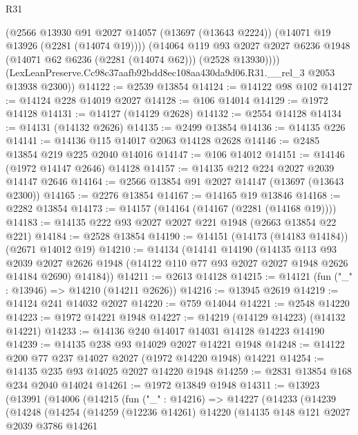 \begin{lexlean}{R31}
\begin{coremodule}
          (@2566
            @13930
            @91
            @2027
            @14057
            (@13697 (@13643 @2224))
            (@14071 @19 @13926 (@2281 (@14074 @19))))
          (@14064
            @119
            @93
            @2027
            @2027
            @6236
            @1948
            (@14071 @62 @6236 (@2281 (@14074 @62)))
            (@2528 @13930))))
      (LexLeanPreserve.Cc98c37aafb92bdd8ec108aa430da9d06.R31.__rel_3 @2053 @13938 @2300))
@14122 := @2539 @13854
@14124 := @14122 @98 @102
@14127 := @14124 @228 @14019 @2027
@14128 := @106 @14014
@14129 := @1972 @14128
@14131 := @14127 (@14129 @2628)
@14132 := @2554 @14128
@14134 := @14131 (@14132 @2626)
@14135 := @2499 @13854
@14136 := @14135 @226
@14141 := @14136 @115 @14017 @2063 @14128 @2628
@14146 := @2485 @13854 @219 @225 @2040 @14016
@14147 := @106 @14012
@14151 := @14146 (@1972 @14147 @2646) @14128
@14157 := @14135 @212 @224 @2027 @2039 @14147 @2646
@14164 := @2566 @13854 @91 @2027 @14147 (@13697 (@13643 @2300))
@14165 := @2276 @13854
@14167 := @14165 @19 @13846
@14168 := @2282 @13854
@14173 := @14157 (@14164 (@14167 (@2281 (@14168 @19))))
@14183 := @14135 @222 @93 @2027 @2027 @221 @1948 (@2663 @13854 @22 @221)
@14184 := @2528 @13854
@14190 := @14151 (@14173 (@14183 @14184)) (@2671 @14012 @19)
@14210 := @14134
    (@14141
      @14190
      (@14135
        @113
        @93
        @2039
        @2027
        @2626
        @1948
        (@14122 @110 @77 @93 @2027 @2027 @1948 @2626 @14184 @2690)
        @14184))
@14211 := @2613 @14128
@14215 := @14121 (fun ("_" : @13946) => @14210 (@14211 @2626))
@14216 := @13945 @2619
@14219 := @14124 @241 @14032 @2027
@14220 := @759 @14044
@14221 := @2548 @14220
@14223 := @1972 @14221 @1948
@14227 := @14219 (@14129 @14223) (@14132 @14221)
@14233 := @14136 @240 @14017 @14031 @14128 @14223 @14190
@14239 := @14135 @238 @93 @14029 @2027 @14221 @1948
@14248 := @14122 @200 @77 @237 @14027 @2027 (@1972 @14220 @1948) @14221
@14254 := @14135 @235 @93 @14025 @2027 @14220 @1948
@14259 := @2831 @13854 @168 @234 @2040 @14024
@14261 := @1972 @13849 @1948
@14311 := @13923
    (@13991
      (@14006
        (@14215
          (fun ("_" : @14216) =>
          @14227
            (@14233
              (@14239
                (@14248
                  (@14254
                    (@14259
                      (@12236 @14261)
                      @14220
                      (@14135
                        @148
                        @121
                        @2027
                        @2039
                        @3786
                        @14261

\end{coremodule}
\end{lexlean}
